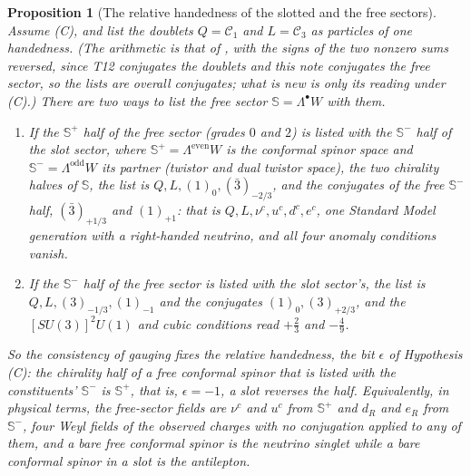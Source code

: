 \documentclass[11pt]{article}
\newtheorem{proposition}[theorem]{Proposition}
\theoremstyle{definition}
\theoremstyle{plain}
\providecommand{\CS}{}\renewcommand{\CS}{{\mathbb{S}^{+}}}
\providecommand{\CSm}{}\renewcommand{\CSm}{{\mathbb{S}^{-}}}
\providecommand{\Con}{}\renewcommand{\Con}{\mathcal{C}}
\providecommand{\Sp}{}\renewcommand{\Sp}{\mathbb{S}}
\begin{document}
\begin{proposition}[The relative handedness of the slotted and the free sectors]\label{c:lepton.relative-handedness-slotted-free-sectors}
Assume (C), and list the doublets $Q = \Con_{1}$ and $L = \Con_{3}$ as particles of one handedness. (The arithmetic is that of \cite[Thm.~5.5(3), last clause]{ButlerT12}, with the signs of the two nonzero sums reversed, since T12 conjugates the doublets and this note conjugates the free sector, so the lists are overall conjugates; what is new is only its reading under (C).) There are two ways to list the free sector $\Sp = \Lambda^{\bullet}W$ with them.
\begin{enumerate}
\item If the $\CS$ half of the free sector (grades $0$ and $2$) is listed with the $\CSm{}$ half of the slot sector, where $\CS = \Lambda^{\mathrm{even}}W$ is the conformal spinor space and $\CSm{} = \Lambda^{\mathrm{odd}}W$ its partner (twistor and dual twistor space), the two chirality halves of $\Sp$, the list is $Q, L, (1)_{0}, (\bar{3})_{-2/3}$, and the conjugates of the free $\CSm{}$ half, $(\bar{3})_{+1/3}$ and $(1)_{+1}$: that is $Q, L, \nu^{c}, u^{c}, d^{c}, e^{c}$, one Standard Model generation with a right-handed neutrino, and all four anomaly conditions vanish.
\item If the $\CSm{}$ half of the free sector is listed with the slot sector's, the list is $Q, L, (3)_{-1/3}, (1)_{-1}$ and the conjugates $(1)_{0}, (3)_{+2/3}$, and the $[SU(3)]^{2}U(1)$ and cubic conditions read $+\tfrac23$ and $-\tfrac49$.
\end{enumerate}
So the consistency of gauging fixes the relative handedness, the bit $\epsilon$ of Hypothesis (C): the chirality half of a free conformal spinor that is listed with the constituents' $\CSm{}$ is $\CS$, that is, $\epsilon = -1$, a slot reverses the half. Equivalently, in physical terms, the free-sector fields are $\nu^{c}$ and $u^{c}$ from $\CS$ and $d_{R}$ and $e_{R}$ from $\CSm{}$, four Weyl fields of the observed charges with no conjugation applied to any of them, and a bare free conformal spinor is the neutrino singlet while a bare conformal spinor in a slot is the antilepton.
\end{proposition}
\end{document}
